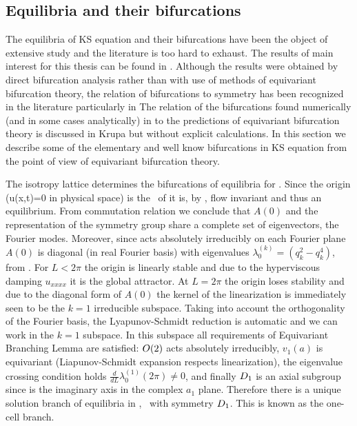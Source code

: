 \subsection{Equilibria and their bifurcations}

The equilibria of KS equation and their bifurcations have been the object of extensive study
and the literature is too hard to exhaust. The results of main interest for this thesis
can be found in . 
Although the results were obtained by direct bifurcation analysis rather than with use of methods of equivariant bifurcation theory, the relation of bifurcations
to  symmetry has been recognized in the literature particularly in  
The relation of the bifurcations found numerically (and in some cases analytically) in \cite{KNSks90} 
to the predictions of equivariant bifurcation theory is discussed in Krupa\cite{Krupa_bifurcations_1990}
but without explicit calculations. In this section we describe some of the elementary and well know
bifurcations in KS equation from the point of view of equivariant bifurcation theory.

The isotropy lattice determines the bifurcations of equilibria for \KS. Since the origin (u(x,t)=0 in 
physical space) is the \fixedsp\ of  it is, by , flow invariant and thus 
an equilibrium. From commutation relation  we conclude that $A(0)$ 
and the representation of the symmetry group  share a complete
set of eigenvectors, the Fourier modes. Moreover, since  acts absolutely irreducibly
on each Fourier plane $A(0)$ is diagonal (in real Fourier basis) 
with eigenvalues $\lambda_0^{(k)}=( q_k^2 - q_k^4 )$, from .
For $L<2\pi$
the origin is linearly stable and due to the hyperviscous damping $u_{xxxx}$ it is the global
attractor. At $L=2\pi$ the origin loses stability and due
to the diagonal form of $A(0)$ the kernel of the linearization is immediately seen to be the
$k=1$ irreducible subspace. Taking into account the orthogonality of the Fourier basis, the Lyapunov-Schmidt reduction is automatic and we can work in the $k=1$ subspace. In this subspace all requirements
of Equivariant Branching Lemma are satisfied: $O(2)$ acts 
absolutely irreducibly, $v_1(a)$ is equivariant (Liapunov-Schmidt expansion respects linearization), the eigenvalue crossing condition holds $\frac{d}{d L}\lambda_0^{(1)}(2\pi)\neq 0$, and finally $D_{1}$ is an
axial subgroup since  is the imaginary axis in the complex $a_1$ plane. 
Therefore there is a unique solution branch of equilibria in , \ie\ with symmetry $D_{1}$. 
This is known as the one-cell branch\cite[for example]{ksgreene88,KNSks90}.





